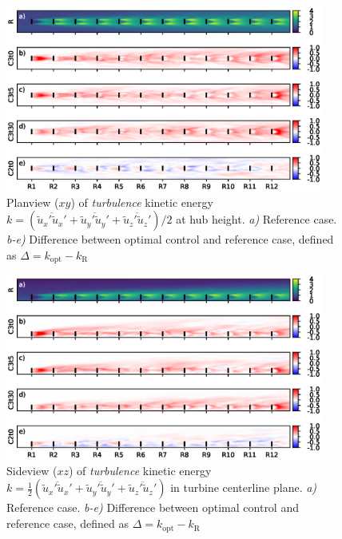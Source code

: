 		\begin{figure}[ht]
			\centering
			\includegraphics[width=0.93\textwidth]{chapters/optimal_induction_control/topview_tke.eps}
			\caption[Planview ($xy$) of \emph{turbulence} kinetic energy $k = (\overline{\widetilde{u}_x'\widetilde{u}_x'} + \overline{\widetilde{u}_y'\widetilde{u}_y'} + \overline{\widetilde{u}_z'\widetilde{u}_z'})/2$ at hub height.]{Planview ($xy$) of \emph{turbulence} kinetic energy $k = (\overline{\widetilde{u}_x'\widetilde{u}_x'} + \overline{\widetilde{u}_y'\widetilde{u}_y'} + \overline{\widetilde{u}_z'\widetilde{u}_z'})/2$ at hub height. \emph{a) } Reference case. \emph{b-e)} Difference between optimal control and reference case, defined as $\Delta = k_{\text{opt}} - k_{\text{R}}$  \label{fig:opt_ind_top_tke}}
		\end{figure}
	
		\begin{figure}[hbt]
			\centering
			\includegraphics[width=0.93\textwidth]{chapters/optimal_induction_control/sideview_tke_side.eps}
			\caption[Sideview ($xz$) of \emph{turbulence} kinetic energy $k = \frac{1}{2}(\overline{\widetilde{u}_x'\widetilde{u}_x'} + \overline{\widetilde{u}_y'\widetilde{u}_y'} + \overline{\widetilde{u}_z'\widetilde{u}_z'})$ in turbine centerline plane.]{Sideview ($xz$) of \emph{turbulence} kinetic energy $k = \frac{1}{2}(\overline{\widetilde{u}_x'\widetilde{u}_x'} + \overline{\widetilde{u}_y'\widetilde{u}_y'} + \overline{\widetilde{u}_z'\widetilde{u}_z'})$ in turbine centerline plane. \emph{a) } Reference case. \emph{b-e)} Difference between optimal control and reference case, defined as $\Delta = k_{\text{opt}} - k_{\text{R}}$  \label{fig:opt_ind_side_tke}}
		\end{figure}

